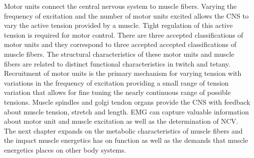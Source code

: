 Motor units connect the central nervous system to muscle fibers. Varying the frequency of excitation and the number of motor units excited allows the CNS to vary the active tension provided by a muscle. Tight regulation of this active tension is required for motor control. There are three accepted classifications of motor units and they correspond to three accepted accepted classifications of muscle fibers. The structural characteristics of these motor units and muscle fibers are related to distinct functional characteristics in twitch and tetany. Recruitment of motor units is the primary mechanism for varying tension with variations in the frequency of excitation providing a small range of tension variation that allows for fine tuning the nearly continuous range of possible tensions. Muscle spindles and golgi tendon organs provide the CNS with feedback about muscle tension, stretch and length. EMG can capture valuable information about motor unit and muscle excitation as well as the determination of NCV. The next chapter expands on the metabolic characteristics of muscle fibers and the impact muscle energetics has on function as well as the demands that muscle energetics places on other body systems.

\printbibliography[heading=subbibintoc]
